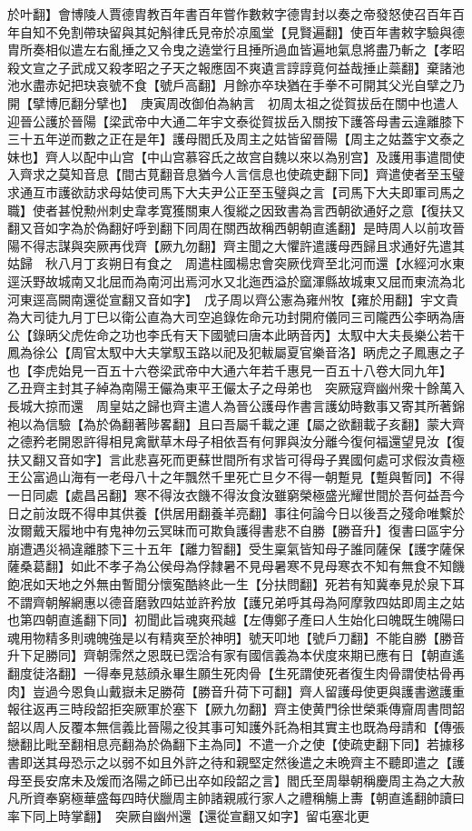 於叶翻】會博陵人賈德胄教百年書百年嘗作數敕字德胄封以奏之帝發怒使召百年百年自知不免割帶玦留與其妃斛律氏見帝於凉風堂【見賢遍翻】使百年書敕字驗與德胄所奏相似遣左右亂捶之又令曳之遶堂行且捶所過血皆遍地氣息將盡乃斬之【孝昭殺文宣之子武成又殺孝昭之子天之報應固不爽遺言諄諄竟何益哉捶止蘂翻】棄諸池池水盡赤妃把玦哀號不食【號戶高翻】月餘亦卒玦猶在手拳不可開其父光自擘之乃開【擘博厄翻分擘也】　庚寅周改御伯為納言　初周太祖之從賀拔岳在關中也遣人迎晉公護於晉陽【梁武帝中大通二年宇文泰從賀拔岳入關按下護答母書云違離膝下三十五年逆而數之正在是年】護母閻氏及周主之姑皆留晉陽【周主之姑蓋宇文泰之妹也】齊人以配中山宫【中山宫慕容氏之故宫自魏以來以為别宫】及護用事遣間使入齊求之莫知音息【間古莧翻音息猶今人言信息也使疏吏翻下同】齊遣使者至玉璧求通互市護欲訪求母姑使司馬下大夫尹公正至玉璧與之言【司馬下大夫即軍司馬之職】使者甚悅勲州刺史韋孝寛獲關東人復縱之因致書為言西朝欲通好之意【復扶又翻又音如字為於偽翻好呼到翻下同周在關西故稱西朝朝直遙翻】是時周人以前攻晉陽不得志謀與突厥再伐齊【厥九勿翻】齊主聞之大懼許遣護母西歸且求通好先遣其姑歸　秋八月丁亥朔日有食之　周遣柱國楊忠會突厥伐齊至北河而還【水經河水東逕沃野故城南又北屈而為南河出焉河水又北迤西溢於窳渾縣故城東又屈而東流為北河東逕高闕南還從宣翻又音如字】　戊子周以齊公憲為雍州牧【雍於用翻】宇文貴為大司徒九月丁巳以衛公直為大司空追錄佐命元功封開府儀同三司隴西公李昞為唐公【錄昞父虎佐命之功也李氏有天下國號曰唐本此昞音丙】太馭中大夫長樂公若干鳳為徐公【周官太馭中大夫掌馭玉路以祀及犯軷屬夏官樂音洛】昞虎之子鳳惠之子也【李虎始見一百五十六卷梁武帝中大通六年若千惠見一百五十八卷大同九年】　乙丑齊主封其子綽為南陽王儼為東平王儼太子之母弟也　突厥寇齊幽州衆十餘萬入長城大掠而還　周皇姑之歸也齊主遣人為晉公護母作書言護幼時數事又寄其所著錦袍以為信驗【為於偽翻著陟畧翻】且曰吾屬千載之運【屬之欲翻載子亥翻】蒙大齊之德矜老開恩許得相見禽獸草木母子相依吾有何罪與汝分離今復何福還望見汝【復扶又翻又音如字】言此悲喜死而更蘇世間所有求皆可得母子異國何處可求假汝貴極王公富過山海有一老母八十之年飄然千里死亡旦夕不得一朝蹔見【蹔與暫同】不得一日同處【處昌呂翻】寒不得汝衣饑不得汝食汝雖窮榮極盛光耀世間於吾何益吾今日之前汝既不得申其供養【供居用翻養羊亮翻】事往何論今日以後吾之殘命唯繫於汝爾戴天履地中有鬼神勿云冥昧而可欺負護得書悲不自勝【勝音升】復書曰區宇分崩遭遇災禍違離膝下三十五年【離力智翻】受生稟氣皆知母子誰同薩保【護字薩保薩桑葛翻】如此不孝子為公侯母為俘隸暑不見母暑寒不見母寒衣不知有無食不知饑飽冺如天地之外無由暫聞分懷寃酷終此一生【分扶問翻】死若有知冀奉見於泉下耳不謂齊朝解網惠以德音磨敦四姑並許矜放【護兄弟呼其母為阿摩敦四姑即周主之姑也第四朝直遙翻下同】初聞此旨魂爽飛越【左傳鄭子產曰人生始化曰魄既生魄陽曰魂用物精多則魂魄強是以有精爽至於神明】號天叩地【號戶刀翻】不能自勝【勝音升下足勝同】齊朝霈然之恩既已霑洽有家有國信義為本伏度來期已應有日【朝直遙翻度徒洛翻】一得奉見慈顔永畢生願生死肉骨【生死謂使死者復生肉骨謂使枯骨再肉】豈過今恩負山戴嶽未足勝荷【勝音升荷下可翻】齊人留護母使更與護書邀護重報往返再三時段韶拒突厥軍於塞下【厥九勿翻】齊主使黄門徐世榮乘傳齎周書問韶韶以周人反覆本無信義比晉陽之役其事可知護外託為相其實主也既為母請和【傳張戀翻比毗至翻相息亮翻為於偽翻下主為同】不遣一介之使【使疏吏翻下同】若據移書即送其母恐示之以弱不如且外許之待和親堅定然後遣之未晩齊主不聽即遣之【護母至長安席未及煖而洛陽之師已出卒如段韶之言】閻氏至周舉朝稱慶周主為之大赦凡所資奉窮極華盛每四時伏臘周主帥諸親戚行家人之禮稱觴上夀【朝直遙翻帥讀曰率下同上時掌翻】　突厥自幽州還【還從宣翻又如字】留屯塞北更